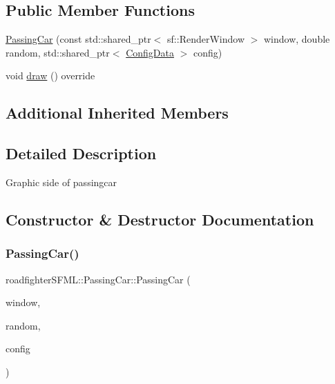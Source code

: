 \subsection*{Public Member Functions}
\begin{DoxyCompactItemize}
\item 
\hyperlink{classroadfighterSFML_1_1PassingCar_ab8a4b6bb0309aa9ca0d4df67b0fa12a3}{Passing\+Car} (const std\+::shared\+\_\+ptr$<$ sf\+::\+Render\+Window $>$ window, double random, std\+::shared\+\_\+ptr$<$ \hyperlink{classConfigData}{Config\+Data} $>$ config)
\item 
void \hyperlink{classroadfighterSFML_1_1PassingCar_ae8d3cff5198ad85dde5ab864b0528337}{draw} () override
\end{DoxyCompactItemize}
\subsection*{Additional Inherited Members}


\subsection{Detailed Description}
Graphic side of passingcar 

\subsection{Constructor \& Destructor Documentation}
\mbox{\label{classroadfighterSFML_1_1PassingCar_ab8a4b6bb0309aa9ca0d4df67b0fa12a3}} 
\subsubsection{\texorpdfstring{Passing\+Car()}{PassingCar()}}
{\footnotesize\ttfamily roadfighter\+S\+F\+M\+L\+::\+Passing\+Car\+::\+Passing\+Car (\begin{DoxyParamCaption}\item[{const std\+::shared\+\_\+ptr$<$ sf\+::\+Render\+Window $>$}]{window,  }\item[{double}]{random,  }\item[{std\+::shared\+\_\+ptr$<$ \hyperlink{classConfigData}{Config\+Data} $>$}]{config }\end{DoxyParamCaption})}

